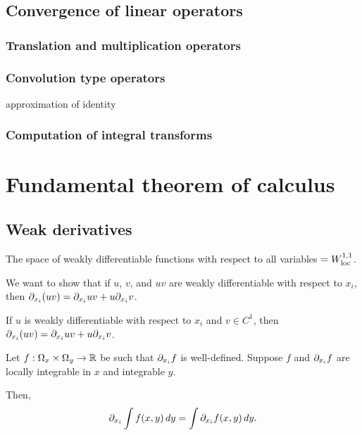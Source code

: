 \documentclass{../note}
\begin{document}
\chapter{Convergence of linear operators}
\section{Translation and multiplication operators}

\section{Convolution type operators}
approximation of identity

\section{Computation of integral transforms}











\part{Fundamental theorem of calculus}

\chapter{Weak derivatives}

The space of weakly differentiable functions with respect to all variables $=W_{\mathrm{loc}}^{1,1}$.

\begin{prb}
We want to show that if $u$, $v$, and $uv$ are weakly differentiable with respect to $x_i$, then $\pd_{x_i}(uv)=\pd_{x_i}uv+u\pd_{x_i}v$.
\begin{parts}
\item If $u$ is weakly differentiable with respect to $x_i$ and $v\in C^1$, then $\pd_{x_i}(uv)=\pd_{x_i}uv+u\pd_{x_i}v$.
\end{parts}
\end{prb}


\begin{prb}
Let $f:\Omega_x\times\Omega_y\to\mathbb{R}$ be such that $\pd_{x_i}f$ is well-defined. Suppose $f$ and $\pd_{x_i}f$ are locally integrable in $x$ and integrable $y$.

Then,
\[\pd_{x_i}\int f(x,y)\,dy=\int\pd_{x_i}f(x,y)\,dy.\]
\end{prb}
\end{document}
